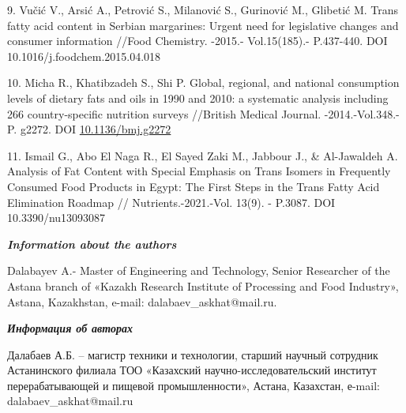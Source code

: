 \begin{references}
9. Vučić V., Arsić A., Petrović S., Milanović S., Gurinović M., Glibetić
M. Trans fatty acid content in Serbian margarines: Urgent need for
legislative changes and consumer information //Food Chemistry. -2015.-
Vol.15(185).- P.437-440. DOI 10.1016/j.foodchem.2015.04.018

10. Micha R., Khatibzadeh S., Shi P. Global, regional, and national
consumption levels of dietary fats and oils in 1990 and 2010: a
systematic analysis including 266 country-specific nutrition surveys
//British Medical Journal. -2014.-Vol.348.-P. g2272. DOI
\href{https://doi.org/10.1136/bmj.g2272}{10.1136/bmj.g2272}

11. Ismail G., Abo El Naga R., El Sayed Zaki M., Jabbour J., \&
Al-Jawaldeh A. Analysis of Fat Content with Special Emphasis on Trans
Isomers in Frequently Consumed Food Products in Egypt: The First Steps
in the Trans Fatty Acid Elimination Roadmap // Nutrients.-2021.-Vol.
13(9). - P.3087. DOI 10.3390/nu13093087
\end{references}

\begin{authorinfo}
\emph{{\bfseries Information about the authors}}

Dalabayev A.- Master of Engineering and Technology, Senior Researcher of
the Astana branch of «Kazakh Research Institute of Processing and Food
Industry», Astana, Kazakhstan, e-mail: dalabaev\_askhat@mail.ru.

\emph{{\bfseries Информация об авторах}}

Далабаев А.Б. -- магистр техники и технологии, старший научный сотрудник
Астанинского филиала ТОО «Казахский научно-исследовательский институт
перерабатывающей и пищевой промышленности», Астана, Казахстан, е-mail:\\
dalabaev\_askhat@mail.ru
\end{authorinfo}
